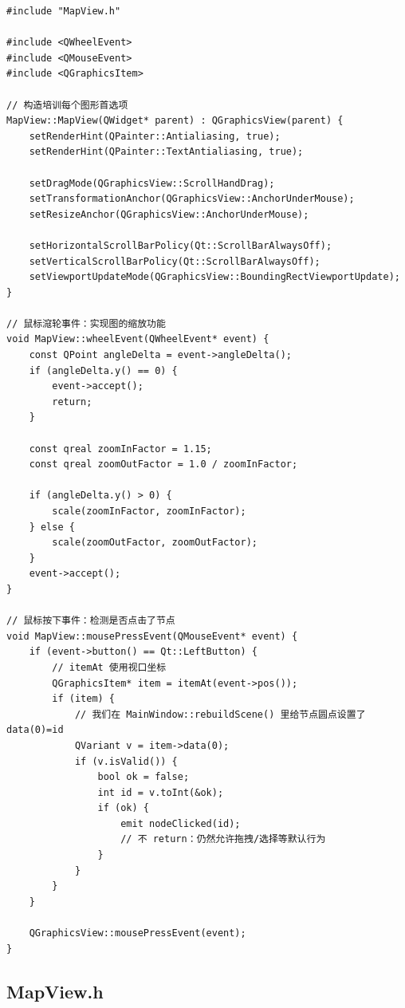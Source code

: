 \documentclass[UTF8,12pt,a4paper]{ctexart}
\begin{document}
\begin{lstlisting}[caption={MapView.cpp 源码}]
#include "MapView.h"

#include <QWheelEvent>
#include <QMouseEvent>
#include <QGraphicsItem>

// 构造培训每个图形首选项
MapView::MapView(QWidget* parent) : QGraphicsView(parent) {
    setRenderHint(QPainter::Antialiasing, true);
    setRenderHint(QPainter::TextAntialiasing, true);

    setDragMode(QGraphicsView::ScrollHandDrag);
    setTransformationAnchor(QGraphicsView::AnchorUnderMouse);
    setResizeAnchor(QGraphicsView::AnchorUnderMouse);

    setHorizontalScrollBarPolicy(Qt::ScrollBarAlwaysOff);
    setVerticalScrollBarPolicy(Qt::ScrollBarAlwaysOff);
    setViewportUpdateMode(QGraphicsView::BoundingRectViewportUpdate);
}

// 鼠标滱轮事件：实现图的缩放功能
void MapView::wheelEvent(QWheelEvent* event) {
    const QPoint angleDelta = event->angleDelta();
    if (angleDelta.y() == 0) {
        event->accept();
        return;
    }

    const qreal zoomInFactor = 1.15;
    const qreal zoomOutFactor = 1.0 / zoomInFactor;

    if (angleDelta.y() > 0) {
        scale(zoomInFactor, zoomInFactor);
    } else {
        scale(zoomOutFactor, zoomOutFactor);
    }
    event->accept();
}

// 鼠标按下事件：检测是否点击了节点
void MapView::mousePressEvent(QMouseEvent* event) {
    if (event->button() == Qt::LeftButton) {
        // itemAt 使用视口坐标
        QGraphicsItem* item = itemAt(event->pos());
        if (item) {
            // 我们在 MainWindow::rebuildScene() 里给节点圆点设置了 data(0)=id
            QVariant v = item->data(0);
            if (v.isValid()) {
                bool ok = false;
                int id = v.toInt(&ok);
                if (ok) {
                    emit nodeClicked(id);
                    // 不 return：仍然允许拖拽/选择等默认行为
                }
            }
        }
    }

    QGraphicsView::mousePressEvent(event);
}

\end{lstlisting}

\subsection{MapView.h}
\end{document}
